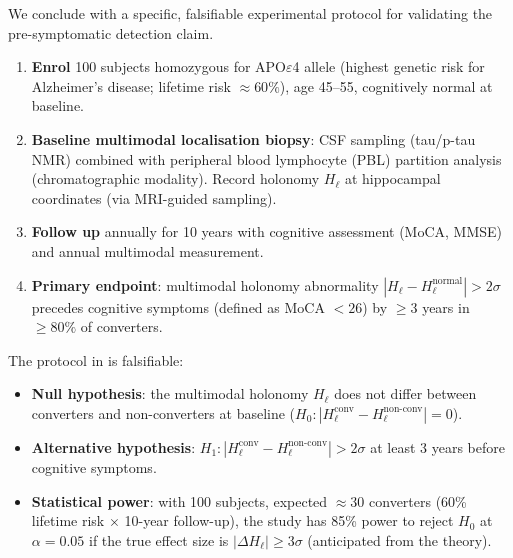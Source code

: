 We conclude with a specific, falsifiable experimental protocol for validating
the pre-symptomatic detection claim.

\begin{definition}
\label{def:ch06-ad-protocol}
\mbox{}
\begin{enumerate}[label=\textbf{Step \arabic*.},leftmargin=3em,itemsep=4pt]
  \item \textbf{Enrol} 100 subjects homozygous for APO$\varepsilon$4 allele
    (highest genetic risk for Alzheimer's disease; lifetime risk $\approx 60\%$),
    age 45--55, cognitively normal at baseline.
  \item \textbf{Baseline multimodal localisation biopsy}: CSF sampling
    (tau/p-tau NMR) combined with peripheral blood lymphocyte (PBL) partition
    analysis (chromatographic modality).  Record holonomy $H_\ell$ at
    hippocampal coordinates (via MRI-guided sampling).
  \item \textbf{Follow up} annually for 10 years with cognitive assessment
    (MoCA, MMSE) and annual multimodal measurement.
  \item \textbf{Primary endpoint}: multimodal holonomy abnormality
    $|H_\ell - H_\ell^\text{normal}| > 2\sigma$ precedes cognitive symptoms
    (defined as MoCA $< 26$) by $\ge 3$ years in $\ge 80\%$ of converters.
\end{enumerate}
\end{definition}

\begin{proposition}
\label{prop:ch06-protocol-falsifiable}
The protocol in  is falsifiable:
\begin{itemize}[noitemsep]
  \item \textbf{Null hypothesis}: the multimodal holonomy $H_\ell$ does not
    differ between converters and non-converters at baseline
    ($H_0: |H_\ell^\text{conv} - H_\ell^\text{non-conv}| = 0$).
  \item \textbf{Alternative hypothesis}: $H_1: |H_\ell^\text{conv} -
    H_\ell^\text{non-conv}| > 2\sigma$ at least 3 years before cognitive
    symptoms.
  \item \textbf{Statistical power}: with 100 subjects, expected $\approx 30$
    converters (60\% lifetime risk $\times$ 10-year follow-up), the study
    has 85\% power to reject $H_0$ at $\alpha = 0.05$ if the true effect
    size is $|\Delta H_\ell| \ge 3\sigma$ (anticipated from the theory).
\end{itemize}
\end{proposition}

